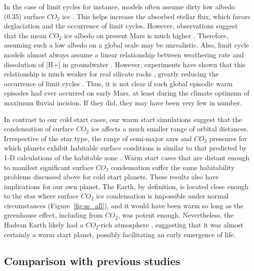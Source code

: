 \documentclass[fleqn,usenatbib]{mnras}
\begin{document}
In the case of limit cycles for instance, models often assume dirty low albedo (0.35) surface $CO_{\mathrm{2}}$ ice \citep{batalha2016, kadoya_outer_2019,hayworth_warming_2020}. This helps increase the absorbed stellar flux, which favors deglaciation and the occurrence of limit cycles. However, observations suggest that the mean $CO_{\mathrm{2}}$ ice albedo on present Mars is much higher \citep{forget2013}. Therefore, assuming such a low albedo on a global scale may be unrealistic. Also, limit cycle models almost always assume a linear relationship between weathering rate and dissolution of [H+] in groundwater \citep{batalha2016,kadoya_outer_2019,hayworth_warming_2020}. However, experiments have shown that this relationship is much weaker for real silicate rocks \citep{asolekar1991}, greatly reducing the occurrence of limit cycles \citep{ramirez2017mars}. Thus, it is not clear if such global episodic warm episodes had ever occurred on early Mars, at least during the climate optimum of maximum fluvial incision. If they did, they may have been very few in number.  

In contrast to our cold start cases, our warm start simulations suggest that the condensation of surface $CO_{\mathrm{2}}$ ice affects a much smaller range of orbital distances. Irrespective of the star type, the range of semi-major axes and $CO_{\mathrm{2}}$ pressures for which planets exhibit habitable surface conditions is similar to that predicted by 1-D calculations of the habitable zone \citep{kasting1993, Ramirez2018}. Warm start cases that are distant enough to manifest significant surface $CO_{\mathrm{2}}$ condensation suffer the same habitability problems discussed above for cold start planets. These results also have implications for our own planet. The Earth, by definition, is located close enough to the star where surface $CO_{\mathrm{2}}$ ice condensation is impossible under normal circumstances (Figure~\ref{fig:ss_all}), and it would have been warm so long as the greenhouse effect, including from $CO_{\mathrm{2}}$, was potent enough. Nevertheless, the Hadean Earth likely had a $CO_{\mathrm{2}}$-rich atmosphere \citep{kasting2014}, suggesting that it was almost certainly a warm start planet, possibly facilitating an early emergence of life.

\subsection{Comparison with previous studies}
\end{document}
